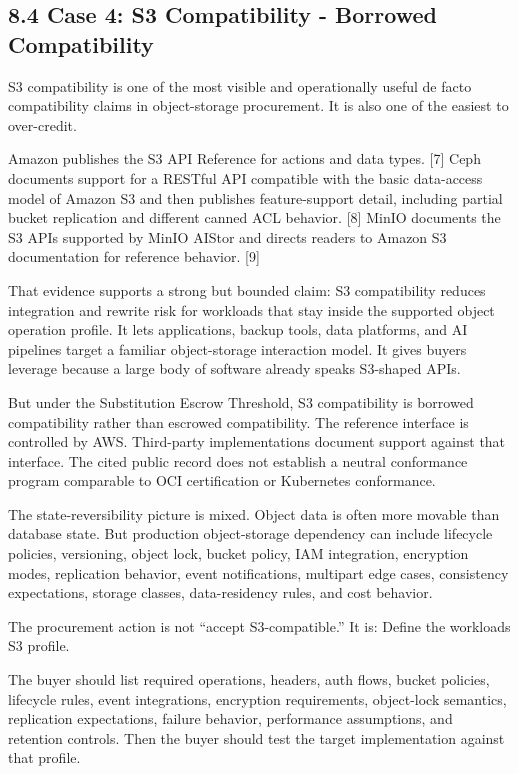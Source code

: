 \documentclass[11pt]{article}
\begin{document}
\subsection{8.4 Case 4: S3 Compatibility - Borrowed Compatibility}\label{case-4-s3-compatibility-borrowed-compatibility}

S3 compatibility is one of the most visible and operationally useful de facto compatibility claims in object-storage procurement. It is also one of the easiest to over-credit.

Amazon publishes the S3 API Reference for actions and data types. {[}7{]} Ceph documents support for a RESTful API compatible with the basic data-access model of Amazon S3 and then publishes feature-support detail, including partial bucket replication and different canned ACL behavior. {[}8{]} MinIO documents the S3 APIs supported by MinIO AIStor and directs readers to Amazon S3 documentation for reference behavior. {[}9{]}

That evidence supports a strong but bounded claim: S3 compatibility reduces integration and rewrite risk for workloads that stay inside the supported object operation profile. It lets applications, backup tools, data platforms, and AI pipelines target a familiar object-storage interaction model. It gives buyers leverage because a large body of software already speaks S3-shaped APIs.

But under the Substitution Escrow Threshold, S3 compatibility is borrowed compatibility rather than escrowed compatibility. The reference interface is controlled by AWS. Third-party implementations document support against that interface. The cited public record does not establish a neutral conformance program comparable to OCI certification or Kubernetes conformance.

The state-reversibility picture is mixed. Object data is often more movable than database state. But production object-storage dependency can include lifecycle policies, versioning, object lock, bucket policy, IAM integration, encryption modes, replication behavior, event notifications, multipart edge cases, consistency expectations, storage classes, data-residency rules, and cost behavior.

The procurement action is not ``accept S3-compatible.'' It is: Define the workload\textquotesingle s S3 profile.

The buyer should list required operations, headers, auth flows, bucket policies, lifecycle rules, event integrations, encryption requirements, object-lock semantics, replication expectations, failure behavior, performance assumptions, and retention controls. Then the buyer should test the target implementation against that profile.
\end{document}
